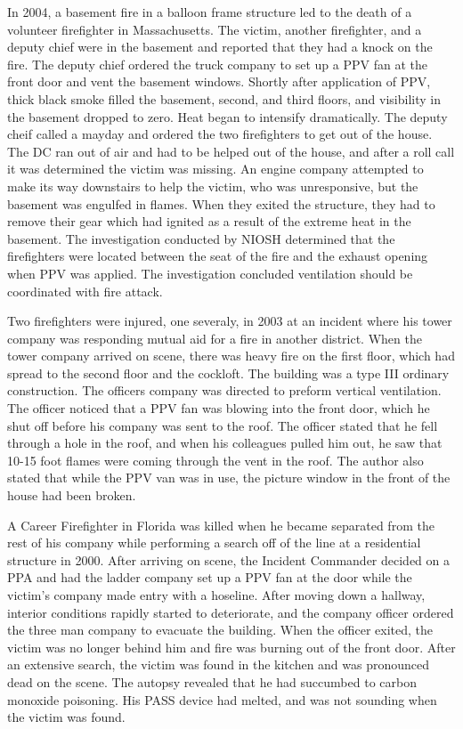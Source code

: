 \documentclass{article}
\begin{document}
In 2004, a basement fire in a balloon frame structure led to the death of a volunteer firefighter in Massachusetts. The victim, another firefighter, and a deputy chief were in the basement and reported that they had a knock on the fire. The deputy chief ordered the truck company to set up a PPV fan at the front door and vent the basement windows. Shortly after application of PPV, thick black smoke filled the basement, second, and third floors, and visibility in the basement dropped to zero.  Heat began to intensify dramatically. The deputy cheif called a mayday and ordered the two firefighters to get out of the house. The DC ran out of air and had to be helped out of the house, and after a roll call it was determined the victim was missing. An engine company attempted to make its way downstairs to help the victim, who was unresponsive, but the basement was engulfed in flames. When they exited the structure, they had to remove their gear which had ignited as a result of the extreme heat in the basement. The investigation conducted by NIOSH determined that the firefighters were located between the seat of the fire and the exhaust opening when PPV was applied. The investigation concluded ventilation should be coordinated with fire attack.\cite{NIOSHF2004-02}

Two firefighters were injured, one severaly, in 2003 at an incident where his tower company was responding mutual aid for a fire in another district. When the tower company arrived on scene, there was heavy fire on the first floor, which had spread to the second floor and the cockloft. The building was a type III ordinary construction. The officers company was directed to preform vertical ventilation. The officer noticed that a PPV fan was blowing into the front door, which he shut off before his company was sent to the roof. The officer stated that he fell through a hole in the roof, and when his colleagues pulled him out, he saw that 10-15 foot flames were coming through the vent in the roof. The author also stated that while the PPV van was in use, the picture window in the front of the house had been broken.\cite{GoldfelderCritCoord}

A Career Firefighter in Florida was killed when he became separated from the rest of his company while performing a search off of the line at a residential structure in 2000. After arriving on scene, the Incident Commander decided on a PPA and had the ladder company set up a PPV fan at the door while the victim’s company made entry with a hoseline. After moving down a hallway, interior conditions rapidly started to deteriorate, and the company officer ordered the three man company to evacuate the building. When the officer exited, the victim was no longer behind him and fire was burning out of the front door.  After an extensive search, the victim was found in the kitchen and was pronounced dead on the scene. The autopsy revealed that he had succumbed to carbon monoxide poisoning. His PASS device had melted, and was not sounding when the victim was found.\cite{NIOSHF2000_44}
	
\end{document}
